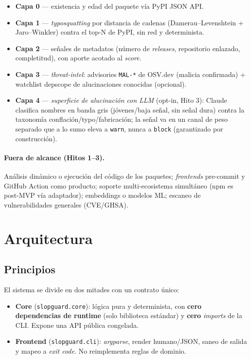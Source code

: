 \documentclass[11pt,a4paper]{article}
\begin{document}
\begin{itemize}[nosep]
  \item \textbf{Capa 0} --- existencia y edad del paquete vía PyPI JSON API.
  \item \textbf{Capa 1} --- \emph{typosquatting} por distancia de cadenas
  (Damerau--Levenshtein + Jaro--Winkler) contra el top-N de PyPI, sin red y determinista.
  \item \textbf{Capa 2} --- señales de metadatos (número de \emph{releases}, repositorio
  enlazado, completitud), con aporte acotado al \emph{score}.
  \item \textbf{Capa 3} --- \emph{threat-intel}: advisories \texttt{MAL-*} de OSV.dev
  (malicia confirmada) + watchlist depscope de alucinaciones conocidas (opcional).
  \item \textbf{Capa 4} --- \emph{superficie de alucinación con LLM} (opt-in, Hito 3):
  Claude clasifica nombres en banda gris (jóvenes/baja señal, sin señal dura) contra la
  taxonomía conflación/typo/fabricación; la señal va en un canal de peso separado que a lo
  sumo eleva a \texttt{warn}, nunca a \texttt{block} (garantizado por construcción).
\end{itemize}

\paragraph{Fuera de alcance (Hitos 1--3).} Análisis dinámico o ejecución del código de los
paquetes; \emph{frontends} pre-commit
y GitHub Action como producto; soporte multi-ecosistema simultáneo (npm es post-MVP vía
adaptador); embeddings o modelos ML; escaneo de vulnerabilidades generales (CVE/GHSA).

\section{Arquitectura}

\subsection{Principios}
El sistema se divide en dos mitades con un contrato único:
\begin{itemize}[nosep]
  \item \textbf{Core} (\texttt{slopguard.core}): lógica pura y determinista, con
  \textbf{cero dependencias de runtime} (solo biblioteca estándar) y \textbf{cero}
  \emph{imports} de la CLI. Expone una API pública congelada.
  \item \textbf{Frontend} (\texttt{slopguard.cli}): \emph{argparse}, render
  humano/JSON, saneo de salida y mapeo a \emph{exit code}. No reimplementa reglas de
  dominio.
\end{itemize}
\end{document}
